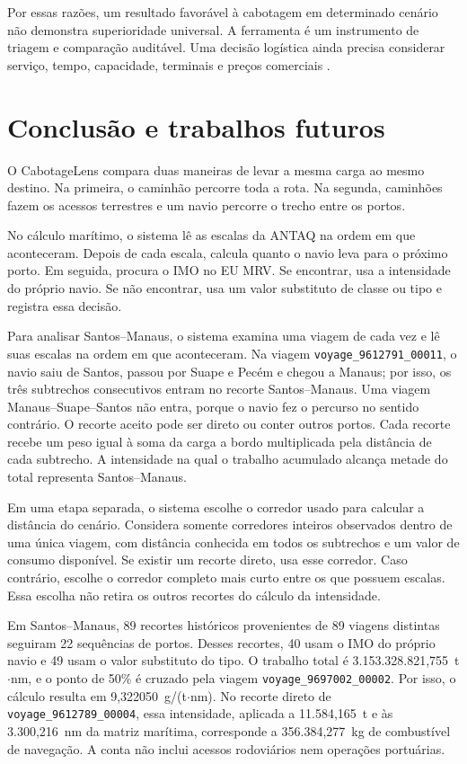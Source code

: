 \documentclass[12pt,a4paper]{article}
\begin{document}
Por essas razões, um resultado favorável à cabotagem em determinado cenário não demonstra superioridade universal. A ferramenta é um instrumento de triagem e comparação auditável. Uma decisão logística ainda precisa considerar serviço, tempo, capacidade, terminais e preços comerciais \cite{competitiveness2024,modalshiftreview2020}.

\section{Conclusão e trabalhos futuros}
\label{sec:conclusoes}

O CabotageLens compara duas maneiras de levar a mesma carga ao mesmo destino. Na primeira, o caminhão percorre toda a rota. Na segunda, caminhões fazem os acessos terrestres e um navio percorre o trecho entre os portos.

No cálculo marítimo, o sistema lê as escalas da ANTAQ na ordem em que aconteceram. Depois de cada escala, calcula quanto o navio leva para o próximo porto. Em seguida, procura o IMO no EU MRV. Se encontrar, usa a intensidade do próprio navio. Se não encontrar, usa um valor substituto de classe ou tipo e registra essa decisão.

Para analisar Santos--Manaus, o sistema examina uma viagem de cada vez e lê suas escalas na ordem em que aconteceram. Na viagem \texttt{voyage\_9612791\_00011}, o navio saiu de Santos, passou por Suape e Pecém e chegou a Manaus; por isso, os três subtrechos consecutivos entram no recorte Santos--Manaus. Uma viagem Manaus--Suape--Santos não entra, porque o navio fez o percurso no sentido contrário. O recorte aceito pode ser direto ou conter outros portos. Cada recorte recebe um peso igual à soma da carga a bordo multiplicada pela distância de cada subtrecho. A intensidade na qual o trabalho acumulado alcança metade do total representa Santos--Manaus.

Em uma etapa separada, o sistema escolhe o corredor usado para calcular a distância do cenário. Considera somente corredores inteiros observados dentro de uma única viagem, com distância conhecida em todos os subtrechos e um valor de consumo disponível. Se existir um recorte direto, usa esse corredor. Caso contrário, escolhe o corredor completo mais curto entre os que possuem escalas. Essa escolha não retira os outros recortes do cálculo da intensidade.

Em Santos--Manaus, 89 recortes históricos provenientes de 89 viagens distintas seguiram 22 sequências de portos. Desses recortes, 40 usam o IMO do próprio navio e 49 usam o valor substituto do tipo. O trabalho total é 3.153.328.821,755~t$\cdot$nm, e o ponto de 50\% é cruzado pela viagem \texttt{voyage\_9697002\_00002}. Por isso, o cálculo resulta em 9,322050~g/(t$\cdot$nm). No recorte direto de \texttt{voyage\_9612789\_00004}, essa intensidade, aplicada a 11.584,165~t e às 3.300,216~nm da matriz marítima, corresponde a 356.384,277~kg de combustível de navegação. A conta não inclui acessos rodoviários nem operações portuárias.
\end{document}
